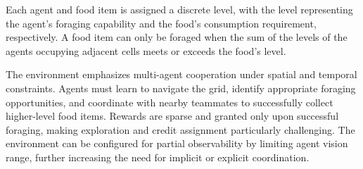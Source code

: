 \documentclass{article}
\begin{document}
Each agent and food item is assigned a discrete level, with the level representing 
the agent's foraging capability and the food's consumption requirement, respectively.
A food item can only be foraged when the sum of the levels of the agents 
occupying adjacent cells meets or exceeds the food's level.

The environment emphasizes multi-agent cooperation under spatial and temporal constraints. 
Agents must learn to navigate the grid, identify appropriate foraging opportunities, 
and coordinate with nearby teammates to successfully collect higher-level food items. 
Rewards are sparse and granted only upon successful foraging, 
making exploration and credit assignment particularly challenging. 
The environment can be configured for partial observability by limiting agent vision range, 
further increasing the need for implicit or explicit coordination.






\printbibliography
\end{document}
